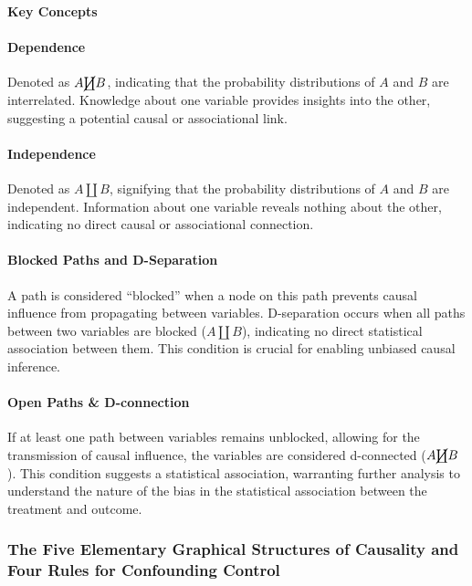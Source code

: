 \documentclass[
  singlecolumn]{article}
\let\oldparagraph\paragraph
\renewcommand{\paragraph}[1]{\oldparagraph{#1}\mbox{}}
\begin{document}
\textbf{Key Concepts}

\paragraph{Dependence}\label{dependence}

Denoted as \(A \cancel\coprod B\), indicating that the probability
distributions of \(A\) and \(B\) are interrelated. Knowledge about one
variable provides insights into the other, suggesting a potential causal
or associational link.

\paragraph{Independence}\label{independence}

Denoted as \(A \coprod B\), signifying that the probability
distributions of \(A\) and \(B\) are independent. Information about one
variable reveals nothing about the other, indicating no direct causal or
associational connection.

\paragraph{Blocked Paths and
D-Separation}\label{blocked-paths-and-d-separation}

A path is considered ``blocked'' when a node on this path prevents
causal influence from propagating between variables. D-separation occurs
when all paths between two variables are blocked (\(A \coprod B\)),
indicating no direct statistical association between them. This
condition is crucial for enabling unbiased causal inference.

\paragraph{Open Paths \& D-connection}\label{open-paths-d-connection}

If at least one path between variables remains unblocked, allowing for
the transmission of causal influence, the variables are considered
d-connected (\(A \cancel\coprod B\)). This condition suggests a
statistical association, warranting further analysis to understand the
nature of the bias in the statistical association between the treatment
and outcome.

\subsubsection{The Five Elementary Graphical Structures of Causality and
Four Rules for Confounding Control}\label{sec-five-elementary}
\end{document}
